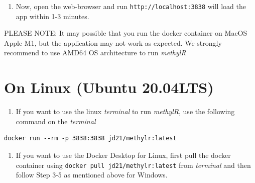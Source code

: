 \documentclass[
  a4paper,
  DIV=11,
  numbers=noendperiod,
  oneside,
  open=any]{scrreport}
\providecommand{\tightlist}{%
  \setlength{\itemsep}{0pt}\setlength{\parskip}{0pt}}\usepackage{longtable,booktabs,array}
\begin{document}
\begin{enumerate}
\def\labelenumi{\arabic{enumi}.}
\setcounter{enumi}{4}
\tightlist
\item
  Now, open the web-browser and run \texttt{http://localhost:3838} will
  load the app within 1-3 minutes.
\end{enumerate}

\begin{tcolorbox}[enhanced jigsaw, opacityback=0, toprule=.15mm, bottomtitle=1mm, colback=white, rightrule=.15mm, breakable, coltitle=black, colbacktitle=quarto-callout-note-color!10!white, toptitle=1mm, arc=.35mm, colframe=quarto-callout-note-color-frame, bottomrule=.15mm, opacitybacktitle=0.6, titlerule=0mm, leftrule=.75mm, title=\textcolor{quarto-callout-note-color}{\faInfo}\hspace{0.5em}{Note}, left=2mm]

PLEASE NOTE: It may possible that you run the docker container on MacOS
Apple M1, but the application may not work as expected. We strongly
recommend to use AMD64 OS architecture to run \emph{methylR}

\end{tcolorbox}

\section{On Linux (Ubuntu 20.04LTS)}\label{on-linux-ubuntu-20.04lts}

\begin{enumerate}
\def\labelenumi{\arabic{enumi}.}
\tightlist
\item
  If you want to use the linux \emph{terminal} to run \emph{methylR},
  use the following command on the \emph{terminal}
\end{enumerate}

\begin{verbatim}
docker run --rm -p 3838:3838 jd21/methylr:latest
\end{verbatim}

\begin{enumerate}
\def\labelenumi{\arabic{enumi}.}
\setcounter{enumi}{1}
\tightlist
\item
  If you want to use the Docker Desktop for Linux, first pull the docker
  container using \texttt{docker\ pull\ jd21/methylr:latest} from
  \emph{terminal} and then follow Step 3-5 as mentioned above for
  Windows.
\end{enumerate}
\end{document}
